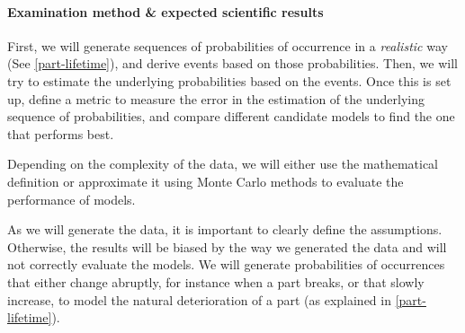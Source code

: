 \documentclass{kththesis}
\begin{document}

\medskip



\paragraph*{Examination method \& expected scientific results}

First, we will generate sequences of probabilities of occurrence in a \emph{realistic} way (See \ref{part-lifetime}), and derive events based on those probabilities.
Then, we will try to estimate the underlying probabilities based on the events.
Once this is set up, define a metric to measure the error in the estimation of the underlying sequence of probabilities, and compare different candidate models to find the one that performs best.

Depending on the complexity of the data, we will either use the mathematical definition or approximate it using Monte Carlo methods to evaluate the performance of models.

\medskip

As we will generate the data, it is important to clearly define the assumptions.
Otherwise, the results will be biased by the way we generated the data and will not correctly evaluate the models.
We will generate probabilities of occurrences that either change abruptly, for instance when a part breaks, or that slowly increase, to model the natural deterioration of a part (as explained in \ref{part-lifetime}).
\end{document}
